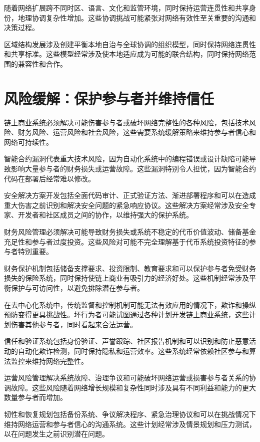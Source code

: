 \documentclass[
  Letterpaper,
]{scrbook}
\begin{document}
随着网络扩展跨不同时区、语言、文化和监管环境，同时保持运营连贯性和共享身份，地理协调复杂性增加。这些协调挑战可能紧张对网络有效性至关重要的沟通和决策过程。

区域结构发展涉及创建平衡本地自治与全球协调的组织模型，同时保持网络连贯性和共享标准。这些模型经常涉及使本地适应成为可能的联合结构，同时保持网络范围的兼容性和合作。

\section{风险缓解：保护参与者并维持信任}\label{ux98ceux9669ux7f13ux89e3ux4fddux62a4ux53c2ux4e0eux8005ux5e76ux7ef4ux6301ux4fe1ux4efb}

链上商业系统必须解决可能伤害参与者或破坏网络完整性的各种风险，包括技术风险、财务风险、运营风险和社会风险，这些需要系统缓解策略来维持参与者信心和网络可持续性。

智能合约漏洞代表重大技术风险，因为自动化系统中的编程错误或设计缺陷可能导致影响大量参与者的财务损失或运营故障。这些漏洞特别令人担忧，因为智能合约代码在部署后经常难以修改。

安全解决方案开发包括全面代码审计、正式验证方法、渐进部署程序和可以在造成重大伤害之前识别和解决安全问题的紧急响应协议。这些解决方案经常涉及安全专家、开发者和社区成员之间的协作，以维持强大的保护系统。

财务风险管理必须解决可能导致财务损失或系统不稳定的代币价值波动、储备基金充足性和参与者过度投资。这些风险对可能不完全理解基于代币系统投资特征的参与者特别重要。

财务保护机制包括储备支撑要求、投资限制、教育要求和可以保护参与者免受财务损失的保险系统，同时保持使链上商业有吸引力的经济好处。这些机制经常涉及平衡保护与可访问性，以避免排除潜在参与者。

在去中心化系统中，传统监督和控制机制可能无法有效应用的情况下，欺诈和操纵预防变得更具挑战性。坏行为者可能试图通过各种计划开发链上商业系统，这些计划伤害其他参与者，同时看起来合法运营。

信任和验证系统包括身份验证、声誉跟踪、社区报告机制和可以识别和防止恶意活动的自动化欺诈检测，同时保持隐私和运营效率。这些系统经常依赖社区参与和算法监控来维持网络完整性。

运营风险管理解决系统故障、治理争议和可能破坏网络运营或损害参与者关系的协调故障。这些风险随着网络增长规模和复杂性同时涉及具有不同利益和能力的更大数量参与者而增加。

韧性和恢复规划包括备份系统、争议解决程序、紧急治理协议和可以在挑战情况下维持网络运营和参与者信心的沟通系统。这些计划经常涉及情景规划和压力测试，以在问题发生之前识别潜在问题。
\end{document}
